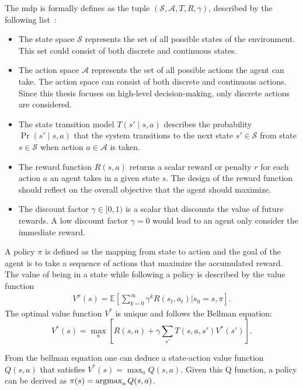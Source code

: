 The \gls{mdp} is formally defines as the tuple $( \mathcal{S}, \mathcal{A}, T, R, \gamma )$, described by the following list~\cite{Kochenderfer2015}:
\begin{itemize}
    \item The state space $\mathcal{S}$ represents the set of all possible states of the environment. This set could consist of both discrete and continuous states.
    \item The action space $\mathcal{A}$ represents the set of all possible actions the agent can take. The action space can  consist of both discrete and continuous actions. Since this thesis focuses on high-level decision-making, only discrete actions are considered.
    \item The state transition model $T(s' \mid s,a)$ describes the probability $\Pr(s' \mid s,a)$ that the system transitions to the next state $s' \in \mathcal{S}$ from state $s \in \mathcal{S}$ when action $a \in \mathcal{A}$ is taken.
    \item The reward function $R(s,a)$ returns a scalar reward or penalty $r$ for each action $a$ an agent takes in a given state $s$. The design of the reward function should reflect on the overall objective that the agent should maximize.
    \item The discount factor $\gamma \in [0,1)$ is a scalar that discounts the value of future rewards. A low discount factor $\gamma = 0$ would lead to an agent only consider the immediate reward.
\end{itemize}

A policy $\pi$ is defined as the mapping from state to action and the goal of the agent is to take a sequence of actions that maximize the accumulated reward. The value of being in a state while following a policy is described by the value function
\begin{align}
    V^\pi(s) = \mathbb{E} \left[ \sum_{k=0}^\infty \gamma^k R(s_t, a_t) | s_0 = s, \pi \right].
\end{align}
The optimal value function $V^*$ is unique and follows the Bellman equation: 
\begin{equation}
    V^*(s)= \max_{a} \left[ R(s, a) + \gamma \sum_{s'} T(s,a,s') V^*(s') \right].
    \label{eq:bellman}
\end{equation}

From the bellman equation one can deduce a state-action value function $Q(s,a)$ that satisfies $V^*(s)=\max_a Q(s,a)$. Given this Q function, a policy can be derived as $\pi(s) = \operatorname*{argmax}_a Q(s,a)$. 

